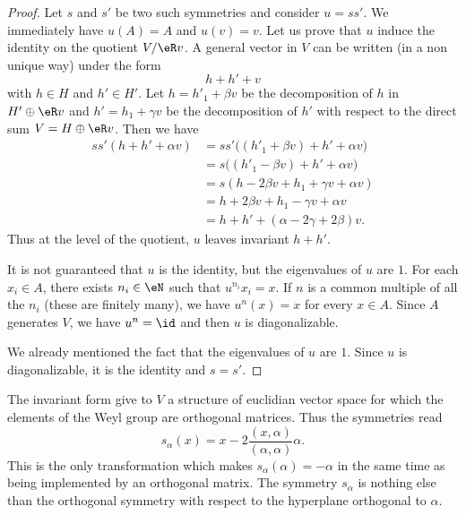 \begin{proof}
    Let \( s\) and \( s'\) be two such symmetries and consider \( u=ss'\). We immediately have \( u(A)=A\) and \( u(v)=v\). Let us prove that \( u\) induce the identity on the quotient \( V/\eR v\). A general vector in \( V\) can be written (in a non unique way) under the form
    \begin{equation}
        h+h'+v
    \end{equation}
    with \( h\in H\) and \( h'\in H'\). Let \( h=h'_1+\beta v\) be the decomposition of \( h\) in \( H'\oplus \eR v\) and \( h'=h_1+\gamma v\) be the decomposition of \( h'\) with respect to the direct sum \( V=H\oplus\eR v\).  Then we have
    \begin{subequations}
        \begin{align}
            ss'(h+h'+\alpha v)&=ss'\big( (h'_1+\beta v)+h'+\alpha v \big)\\
            &=s\big( (h'_1-\beta v)+h'+\alpha v \big)\\
            &=s(h-2\beta v+h_1+\gamma v+\alpha v)\\
            &=h+2\beta v+h_1-\gamma v+\alpha v\\
            &=h+h'+(\alpha-2\gamma+2\beta)v.
        \end{align}
    \end{subequations}
    Thus at the level of the quotient, $u$ leaves invariant \( h+h'\).

    It is not guaranteed that \( u\) is the identity, but the eigenvalues of \( u\) are \( 1\). For each \( x_i\in A\), there exists \( n_i\in\eN\) such that \( u^{n_i}x_i=x\). If \( n\) is a common multiple of all the \( n_i\) (these are finitely many), we have \( u^n(x)=x\) for every \( x\in A\). Since \( A\) generates \( V\), we have \( u^n=\id\) and then \( u\) is diagonalizable.

    We already mentioned the fact that the eigenvalues of \( u\) are \( 1\). Since \( u\) is diagonalizable, it is the identity and \( s=s'\).
\end{proof}

The invariant form give to \( V\) a structure of euclidian vector space for which the elements of the Weyl group are orthogonal matrices. Thus the symmetries read
\begin{equation}    \label{EqSymparnnusul}
    s_{\alpha}(x)=x-2\frac{ (x,\alpha) }{ (\alpha,\alpha) }\alpha.
\end{equation}
This is the only transformation which makes \( s_{\alpha}(\alpha)=-\alpha\) in the same time as being implemented by an orthogonal matrix. The symmetry \( s_{\alpha}\) is nothing else than the orthogonal symmetry with respect to the hyperplane orthogonal to \( \alpha\).

